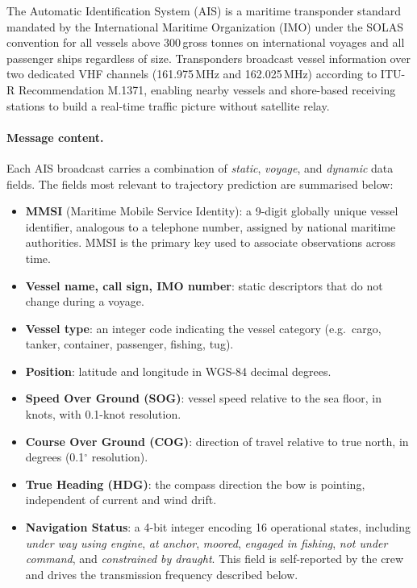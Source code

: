 \documentclass[12pt, a4paper]{article}
\begin{document}
  The Automatic Identification System (AIS) is a maritime transponder standard mandated by
  the International Maritime Organization (IMO) under the SOLAS convention for all vessels
  above 300\,gross tonnes on international voyages and all passenger ships regardless of size.
  Transponders broadcast vessel information over two dedicated VHF channels (161.975\,MHz and
  162.025\,MHz) according to ITU-R Recommendation M.1371, enabling nearby vessels and
  shore-based receiving stations to build a real-time traffic picture without satellite relay.

  \paragraph{Message content.}
  Each AIS broadcast carries a combination of \textit{static}, \textit{voyage}, and
  \textit{dynamic} data fields.  The fields most relevant to trajectory prediction are
  summarised below:

  \begin{itemize}
      \item \textbf{MMSI} (Maritime Mobile Service Identity): a 9-digit globally unique
            vessel identifier, analogous to a telephone number, assigned by national maritime
            authorities.  MMSI is the primary key used to associate observations across time.
      \item \textbf{Vessel name, call sign, IMO number}: static descriptors that do not
            change during a voyage.
      \item \textbf{Vessel type}: an integer code indicating the vessel category
            (e.g.\ cargo, tanker, container, passenger, fishing, tug).
      \item \textbf{Position}: latitude and longitude in WGS-84 decimal degrees.
      \item \textbf{Speed Over Ground (SOG)}: vessel speed relative to the sea floor,
            in knots, with 0.1-knot resolution.
      \item \textbf{Course Over Ground (COG)}: direction of travel relative to true north,
            in degrees (0.1$^{\circ}$ resolution).
      \item \textbf{True Heading (HDG)}: the compass direction the bow is pointing,
            independent of current and wind drift.
      \item \textbf{Navigation Status}: a 4-bit integer encoding 16 operational states,
            including \textit{under way using engine}, \textit{at anchor}, \textit{moored},
            \textit{engaged in fishing}, \textit{not under command}, and
            \textit{constrained by draught}.  This field is self-reported by the crew and
            drives the transmission frequency described below.
  \end{itemize}
\end{document}
